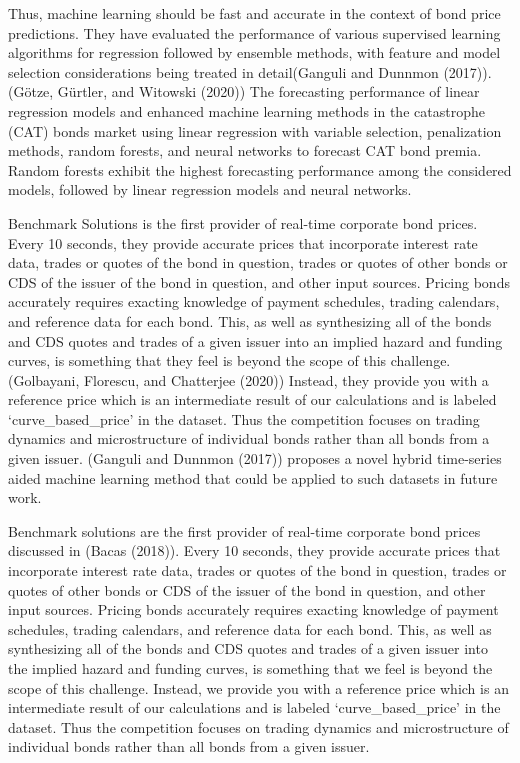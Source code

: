 \documentclass[
  man]{apa6}
\begin{document}
\par

Thus, machine learning should be fast and accurate in the context of bond price predictions. They have evaluated the performance of various supervised learning algorithms for regression followed by ensemble methods, with feature and model selection considerations being treated in detail(Ganguli and Dunnmon (2017)). (Götze, Gürtler, and Witowski (2020)) The forecasting performance of linear regression models and enhanced machine learning methods in the catastrophe (CAT) bonds market using linear regression with variable selection, penalization methods, random forests, and neural networks to forecast CAT bond premia. Random forests exhibit the highest forecasting performance among the considered models, followed by linear regression models and neural networks.

\par

Benchmark Solutions is the first provider of real-time corporate bond prices. Every 10 seconds, they provide accurate prices that incorporate interest rate data, trades or quotes of the bond in question, trades or quotes of other bonds or CDS of the issuer of the bond in question, and other input sources. Pricing bonds accurately requires exacting knowledge of payment schedules, trading calendars, and reference data for each bond. This, as well as synthesizing all of the bonds and CDS quotes and trades of a given issuer into an implied hazard and funding curves, is something that they feel is beyond the scope of this challenge. (Golbayani, Florescu, and Chatterjee (2020)) Instead, they provide you with a reference price which is an intermediate result of our calculations and is labeled `curve\_based\_price' in the dataset. Thus the competition focuses on trading dynamics and microstructure of individual bonds rather than all bonds from a given issuer. (Ganguli and Dunnmon (2017)) proposes a novel hybrid time-series aided machine learning method that could be applied to such datasets in future work.

\par

Benchmark solutions are the first provider of real-time corporate bond prices discussed in (Bacas (2018)). Every 10 seconds, they provide accurate prices that incorporate interest rate data, trades or quotes of the bond in question, trades or quotes of other bonds or CDS of the issuer of the bond in question, and other input sources. Pricing bonds accurately requires exacting knowledge of payment schedules, trading calendars, and reference data for each bond. This, as well as synthesizing all of the bonds and CDS quotes and trades of a given issuer into the implied hazard and funding curves, is something that we feel is beyond the scope of this challenge. Instead, we provide you with a reference price which is an intermediate result of our calculations and is labeled `curve\_based\_price' in the dataset. Thus the competition focuses on trading dynamics and microstructure of individual bonds rather than all bonds from a given issuer.
\end{document}
